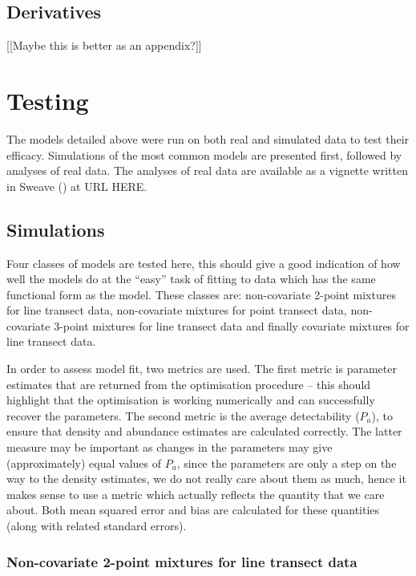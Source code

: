 \subsection{Derivatives}
[[Maybe this is better as an appendix?]]


\section{Testing}

The models detailed above were run on both real and simulated data to test their efficacy. Simulations of the most common models are presented first, followed by analyses of real data. The analyses of real data are available as a vignette written in Sweave (\cite{sweave}) at URL HERE.

\subsection{Simulations}

Four classes of models are tested here, this should give a good indication of how well the models do at the ``easy'' task of fitting to data which has the same functional form as the model. These classes are: non-covariate 2-point mixtures for line transect data, non-covariate mixtures for point transect data, non-covariate 3-point mixtures for line transect data and finally covariate mixtures for line transect data.

In order to assess model fit, two metrics are used. The first metric is parameter estimates that are returned from the optimisation procedure -- this should highlight that the optimisation is working numerically and can successfully recover the parameters. The second metric is the average detectability ($P_a$), to ensure that density and abundance estimates are calculated correctly. The latter measure may be important as changes in the parameters may give (approximately) equal values of $P_a$, since the parameters are only a step on the way to the density estimates, we do not really care about them as much, hence it makes sense to use a metric which actually reflects the quantity that we care about. Both mean squared error and bias are calculated for these quantities (along with related standard errors).



\subsubsection{Non-covariate 2-point mixtures for line transect data}


